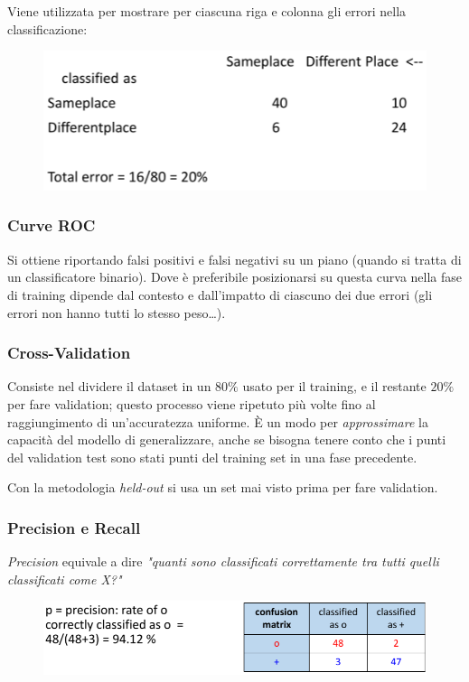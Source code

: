 \documentclass{report}
\begin{document}
Viene utilizzata per mostrare per ciascuna riga e colonna gli errori nella classificazione:

\begin{figure}[H]
    \centering
    \includegraphics[width=0.7\linewidth]{images/confusion-matrix.png}
\end{figure}


\subsubsection{Curve ROC}

Si ottiene riportando falsi positivi e falsi negativi su un piano (quando si tratta di un classificatore binario). Dove è preferibile posizionarsi 
su questa curva nella fase di training dipende dal contesto e dall'impatto di ciascuno dei due errori (gli errori non hanno tutti lo stesso peso\dots).

\subsubsection{Cross-Validation}

Consiste nel dividere il dataset in un $80\%$ usato per il training, e il restante $20\%$ per fare validation; questo processo viene ripetuto 
più volte fino al raggiungimento di un'accuratezza uniforme. È un modo per \textit{approssimare} la capacità del modello di generalizzare, anche se 
bisogna tenere conto che i punti del validation test sono stati punti del training set in una fase precedente.

\noindent Con la metodologia \textit{held-out} si usa un set mai visto prima per fare validation.


\subsubsection{Precision e Recall}

\textit{Precision} equivale a dire \textit{"quanti sono classificati correttamente tra tutti quelli classificati come X?"}

\begin{figure}[H]
    \centering
    \includegraphics[width=1\linewidth]{images/precision.png}
\end{figure}
\end{document}
